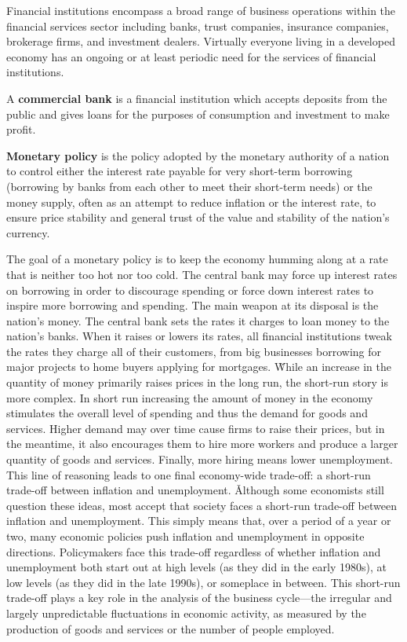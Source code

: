 Financial institutions encompass a broad range of business operations within the financial services sector including
banks, trust companies, insurance companies, brokerage firms, and investment dealers. Virtually everyone living in a
developed economy has an ongoing or at least periodic need for the services of financial institutions.

A \textbf{commercial bank} is a financial institution which accepts deposits from the public and gives loans for the
purposes of consumption and investment to make profit.
\ed

\textbf{Monetary policy} is the policy adopted by the monetary authority of a nation to control either the interest
rate payable for very short-term borrowing (borrowing by banks from each other to meet their short-term needs) or the
money supply, often as an attempt to reduce inflation or the interest rate, to ensure price stability and general
trust of the value and stability of the nation's currency.
\ed

The goal of a monetary policy is to keep the economy humming along at a rate that is neither too hot nor too cold.
The central bank may force up interest rates on borrowing in order to discourage spending or force down interest
rates to inspire more borrowing and spending. The main weapon at its disposal is the nation's money. The central bank
sets the rates it charges to loan money to the nation's banks. When it raises or lowers its rates, all financial
institutions tweak the rates they charge all of their customers, from big businesses borrowing for major projects to
home buyers applying for mortgages. \v

While an increase in the quantity of money primarily raises prices in the long run, the short-run story is more
complex. In short run increasing the amount of money in the economy stimulates the overall level of spending and thus
the demand for goods and services. Higher demand may over time cause firms to raise their prices, but in the
meantime, it also encourages them to hire more workers and produce a larger quantity of goods and services. Finally,
more hiring means lower unemployment. This line of reasoning leads to one final economy-wide trade-off: a short-run
trade-off between inflation and unemployment. \v

Although some economists still question these ideas, most accept that society faces a short-run trade-off between
inflation and unemployment. This simply means that, over a period of a year or two, many economic policies push
inflation and unemployment in opposite directions. Policymakers face this trade-off regardless of whether inflation
and unemployment both start out at high levels (as they did in the early 1980s), at low levels (as they did in the
late 1990s), or someplace in between. This short-run trade-off plays a key role in the analysis of the business
cycle—the irregular and largely unpredictable fluctuations in economic activity, as measured by the production of
goods and services or the number of people employed.

